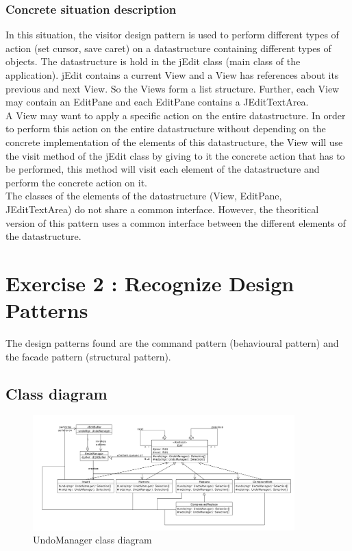 \documentclass[a4paper,10pt]{article}
\begin{document}
\subsubsection{Concrete situation description}
In this situation, the visitor design pattern is used to perform different types of action (set cursor, save caret) on a datastructure containing different types of objects. The datastructure is hold in the jEdit class (main class of the application). jEdit contains a current View and a View has references about its previous and next View. So the Views form a list structure. Further, each View may contain an EditPane and each EditPane contains a JEditTextArea.\\
A View may want to apply a specific action on the entire datastructure. In order to perform this action on the entire datastructure without depending on the concrete implementation of the elements of this datastructure, the View will use the visit method of the jEdit class by giving to it the concrete action that has to be performed, this method will visit each element of the datastructure and perform the concrete action on it.\\
The classes of the elements of the datastructure (View, EditPane, JEditTextArea) do not share a common interface. However, the theoritical version of this pattern uses a common interface between the different elements of the datastructure.


\section{Exercise 2 : Recognize Design Patterns}
The design patterns found are the command pattern (behavioural pattern) and the facade pattern (structural pattern).

\subsection{Class diagram}
\begin{center}
\begin{figure}[h]
  \centerline{\includegraphics[width=0.9\textwidth]{undomanager-class-diagram.pdf}}
  \caption{UndoManager class diagram}
\end{figure}
\end{center}
\end{document}
